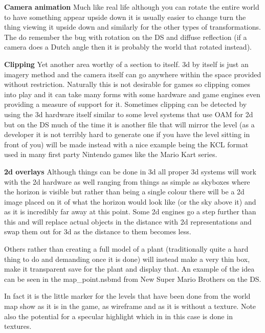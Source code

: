 \documentclass[
]{book}
\begin{document}
\textbf{Camera animation} Much like real life although you can rotate the entire world to have something appear upside down it is usually easier to change turn the thing viewing it upside down and similarly for the other types of transformations. The do remember the bug with rotation on the DS and diffuse reflection (if a camera does a Dutch angle then it is probably the world that rotated instead).

\textbf{Clipping} Yet another area worthy of a section to itself. 3d by itself is just an imagery method and the camera itself can go anywhere within the space provided without restriction. Naturally this is not desirable for games so clipping comes into play and it can take many forms with some hardware and game engines even providing a measure of support for it. Sometimes clipping can be detected by using the 3d hardware itself similar to some level systems that use OAM for 2d but on the DS much of the time it is another file that will mirror the level (as a developer it is not terribly hard to generate one if you have the level sitting in front of you) will be made instead with a nice example being the KCL format used in many first party Nintendo games like the Mario Kart series.

\textbf{2d overlays} Although things can be done in 3d all proper 3d systems will work with the 2d hardware as well ranging from things as simple as skyboxes where the horizon is visible but rather than being a single colour there will be a 2d image placed on it of what the horizon would look like (or the sky above it) and as it is incredibly far away at this point. Some 2d engines go a step further than this and will replace actual objects in the distance with 2d representations and swap them out for 3d as the distance to them becomes less.

Others rather than creating a full model of a plant (traditionally quite a hard thing to do and demanding once it is done) will instead make a very thin box, make it transparent save for the plant and display that. An example of the idea can be seen in the map\_point.nsbmd from New Super Mario Brothers on the DS.

In fact it is the little marker for the levels that have been done from the world map show as it is in the game, as wireframe and as it is without a texture. Note also the potential for a specular highlight which in in this case is done in textures.
\end{document}
